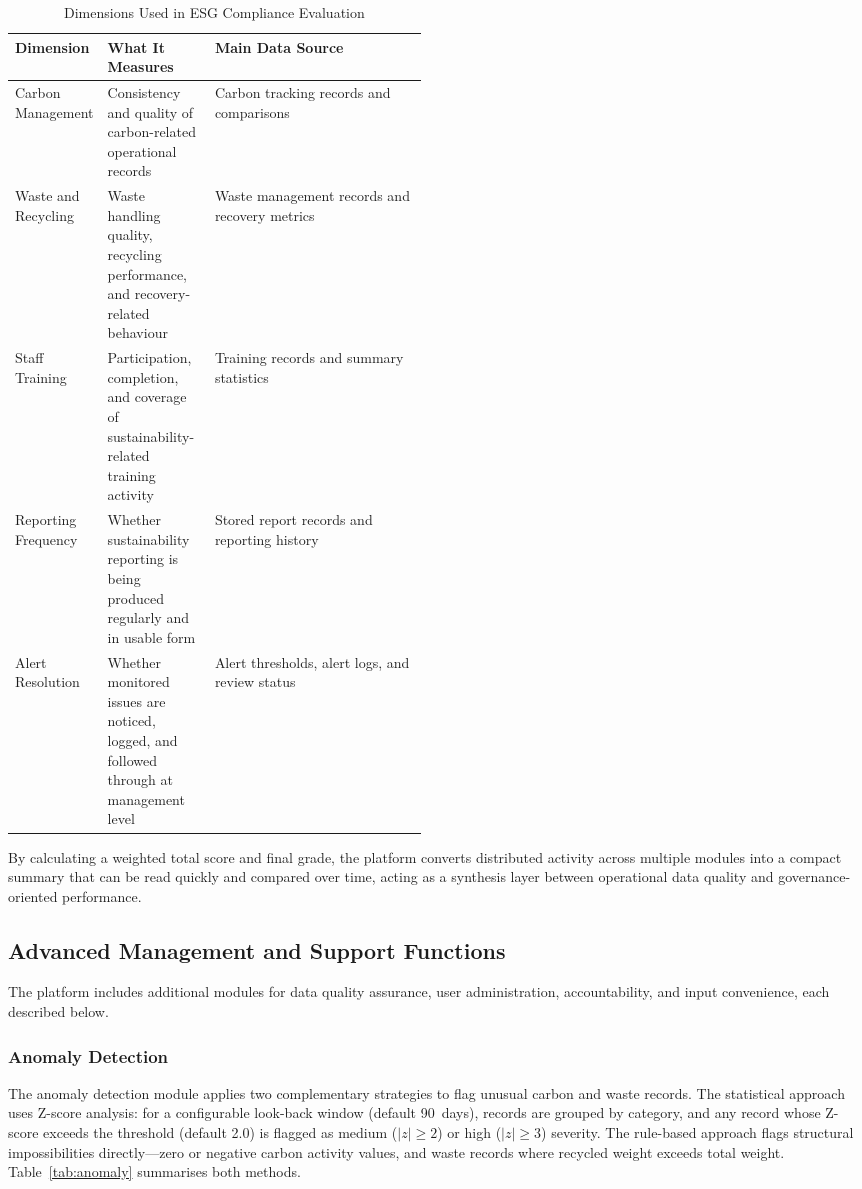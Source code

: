 \documentclass[11pt,a4paper]{article}
\begin{document}
\begin{table}[h]
\centering
\scriptsize
\begin{tabularx}{\linewidth}{@{}p{0.22\linewidth}p{0.26\linewidth}X@{}}
\toprule
\textbf{Dimension} & \textbf{What It Measures} & \textbf{Main Data Source} \\
\midrule
Carbon Management & Consistency and quality of carbon-related operational records & Carbon tracking records and comparisons \\
Waste and Recycling & Waste handling quality, recycling performance, and recovery-related behaviour & Waste management records and recovery metrics \\
Staff Training & Participation, completion, and coverage of sustainability-related training activity & Training records and summary statistics \\
Reporting Frequency & Whether sustainability reporting is being produced regularly and in usable form & Stored report records and reporting history \\
Alert Resolution & Whether monitored issues are noticed, logged, and followed through at management level & Alert thresholds, alert logs, and review status \\
\bottomrule
\end{tabularx}
\caption{Dimensions Used in ESG Compliance Evaluation}
\end{table}

By calculating a weighted total score and final grade, the platform converts distributed activity across multiple modules into a compact summary that can be read quickly and compared over time, acting as a synthesis layer between operational data quality and governance-oriented performance.

\subsection{Advanced Management and Support Functions}
The platform includes additional modules for data quality assurance, user administration, accountability, and input convenience, each described below.

\subsubsection{Anomaly Detection}
The anomaly detection module applies two complementary strategies to flag unusual carbon and waste records. The statistical approach uses Z-score analysis: for a configurable look-back window (default 90~days), records are grouped by category, and any record whose Z-score exceeds the threshold (default 2.0) is flagged as medium ($|z|\geq2$) or high ($|z|\geq3$) severity. The rule-based approach flags structural impossibilities directly---zero or negative carbon activity values, and waste records where recycled weight exceeds total weight. Table~\ref{tab:anomaly} summarises both methods.
\end{document}
